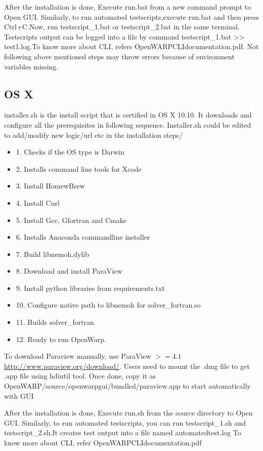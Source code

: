 \documentclass[12pt]{article}
\begin{document}
 After the installation is done, Execute run.bat from a new command prompt to Open GUI.
 Similarly, to run automated testscripts,execute run.bat and then press Ctrl+C.Now, run testscript_1.bat or testscript_2.bat in the same terminal. Testscripts output can be logged into a file by command testscript_1.bat >> test1.log.To know more about CLI, refers OpenWARPCLIdocumentation.pdf. Not following above mentioned steps may throw errors because of environment variables missing.
 
\subsection{OS X}
installer.sh is the install script that is certified in OS X 10.10. It downloads and configure all the prerequisites in following sequence. Installer.sh could be edited to add/modify new logic/url etc in the installation steps/
\begin{itemize}
\item 1. Checks if the OS type is Darwin
\item 2. Installs command line tools for Xcode
\item 3. Install HomewBrew
\item 4. Install Curl
\item 5. Install Gcc, Gfortran and Cmake
\item 6. Installs Anaconda commandline installer
\item 7. Build libnemoh.dylib
\item 8. Download and install ParaView
\item 9. Install python libraries from requirements.txt
\item 10. Configure native path to libnemoh for solver_fortran.so
\item 11. Builds solver_fortran
\item 12. Ready to run OpenWarp.
\end{itemize}
To download Paraview manually, use ParaView $>=4.1$  \url{http://www.paraview.org/download/}. Users need to mount the .dmg file to get .app file using hdiutil tool. Once done, copy it as OpenWARP/source/openwarpgui/bundled/paraview.app to start automatically with GUI

After the installation is done, Execute run.sh from the source directory to Open GUI.
 Similarly, to run automated testscripts, you can run testscript_1.sh and testscript_2.sh.It creates test output into a file named automatedtest.log To know more about CLI, refer OpenWARPCLIdocumentation.pdf
\end{document}
